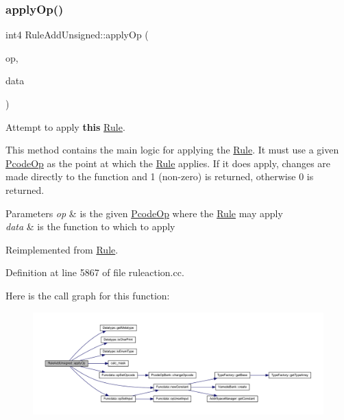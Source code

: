 \subsubsection{\texorpdfstring{applyOp()}{applyOp()}}
{\footnotesize\ttfamily int4 Rule\+Add\+Unsigned\+::apply\+Op (\begin{DoxyParamCaption}\item[{\mbox{\hyperlink{class_pcode_op}{Pcode\+Op}} $\ast$}]{op,  }\item[{\mbox{\hyperlink{class_funcdata}{Funcdata}} \&}]{data }\end{DoxyParamCaption})\hspace{0.3cm}{\ttfamily [virtual]}}



Attempt to apply {\bfseries{this}} \mbox{\hyperlink{class_rule}{Rule}}. 

This method contains the main logic for applying the \mbox{\hyperlink{class_rule}{Rule}}. It must use a given \mbox{\hyperlink{class_pcode_op}{Pcode\+Op}} as the point at which the \mbox{\hyperlink{class_rule}{Rule}} applies. If it does apply, changes are made directly to the function and 1 (non-\/zero) is returned, otherwise 0 is returned. 
\begin{DoxyParams}{Parameters}
{\em op} & is the given \mbox{\hyperlink{class_pcode_op}{Pcode\+Op}} where the \mbox{\hyperlink{class_rule}{Rule}} may apply \\
\hline
{\em data} & is the function to which to apply \\
\hline
\end{DoxyParams}


Reimplemented from \mbox{\hyperlink{class_rule_a4e3e61f066670175009f60fb9dc60848}{Rule}}.



Definition at line 5867 of file ruleaction.\+cc.

Here is the call graph for this function\+:
\nopagebreak
\begin{figure}[H]
\begin{center}
\leavevmode
\includegraphics[width=350pt]{class_rule_add_unsigned_a07c326702413b71711277439c247b932_cgraph}
\end{center}
\end{figure}
\mbox{\label{class_rule_add_unsigned_a6cb39fff450ccb1e748e5d5fd2b6f110}} 
